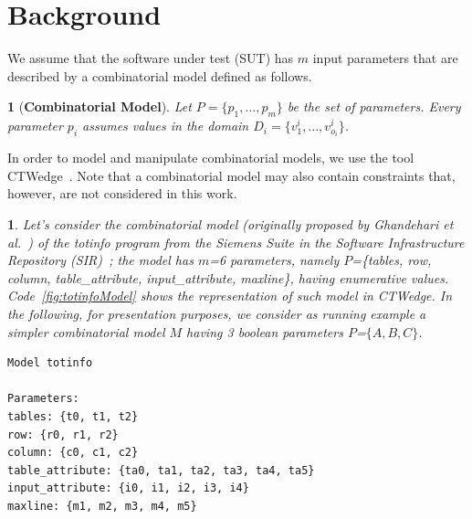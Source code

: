 \documentclass[
12pt, %
oneside, %
english, %
singlespacing, %
headsepline, %
consistentlayout, %
]{MastersDoctoralThesis} %
\newtheorem{defn}[thm]{\protect\definitionname}
\newtheorem{example}[thm]{\protect\examplename}
\providecommand{\definitionname}{Definition}
\providecommand{\examplename}{Example}
\theoremstyle{plain}
\theoremstyle{definition}
\theoremstyle{remark}
\theoremstyle{plain}
\theoremstyle{plain}
\providecommand{\definitionname}{Definition}
\providecommand{\examplename}{Example}
\theoremstyle{remark}
\begin{document}
\section{Background}\label{sec:background}


We assume that the software under test (SUT) has $m$ input parameters that are described by a combinatorial model defined as follows.

\begin{defn}[\textbf{Combinatorial Model}]\label{def:combModel}
	Let $P = \{p_1, \dots , p_m\}$ be the set of parameters. Every parameter $p_i$ assumes values in the domain $D_i = \{v^i_1, \dots , v^i_{o_i}\}$.
\end{defn}

In order to model and manipulate combinatorial models, we use the tool CTWedge~\cite{IWCTGargantini2018}. Note that a combinatorial model may also contain constraints that, however, are not considered in this work.

\begin{example}\label{ex:model}
	Let's consider the combinatorial model (originally proposed by Ghandehari et al.~\cite{ghandehari_applying_2013}) of the \textsf{totinfo} program from the Siemens Suite in the Software Infrastructure Repository (SIR)~\cite{doESE05}; the model has $m$=6 parameters, namely $P$=\{tables, row, column, table\_attribute, input\_attribute, maxline\}, having enumerative values. Code~\ref{fig:totinfoModel} shows the representation of such model in CTWedge. In the following, for presentation purposes, we consider as running example a simpler combinatorial model $M$ having 3 boolean parameters $P$=$\{A, B, C\}$.
\end{example}

\begin{lstlisting}[basicstyle=\footnotesize\sffamily\linespread{1},frame = single,float,caption={A combinatorial model of the input of \textit{totinfo} program, in CTWedge},label={fig:totinfoModel}]
Model totinfo

Parameters:
tables: {t0, t1, t2}
row: {r0, r1, r2}
column: {c0, c1, c2}
table_attribute: {ta0, ta1, ta2, ta3, ta4, ta5}
input_attribute: {i0, i1, i2, i3, i4}
maxline: {m1, m2, m3, m4, m5}
\end{lstlisting}
\end{document}

